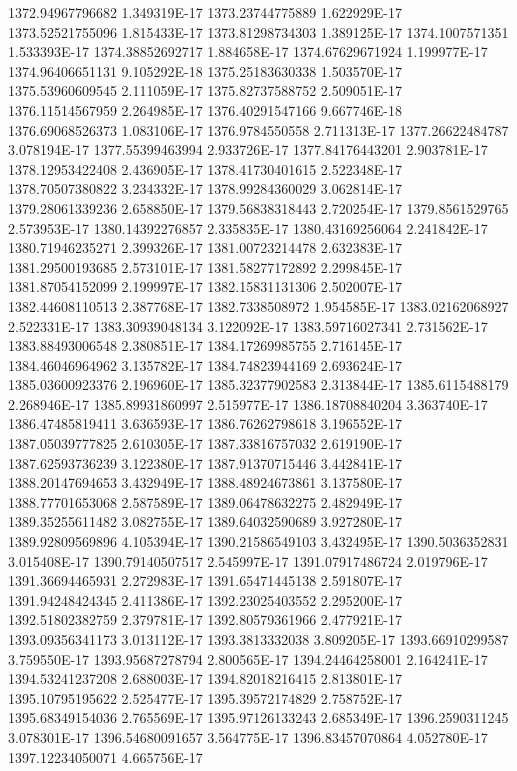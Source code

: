 1372.94967796682  1.349319E-17
1373.23744775889  1.622929E-17
1373.52521755096  1.815433E-17
1373.81298734303  1.389125E-17
1374.1007571351  1.533393E-17
1374.38852692717  1.884658E-17
1374.67629671924  1.199977E-17
1374.96406651131  9.105292E-18
1375.25183630338  1.503570E-17
1375.53960609545  2.111059E-17
1375.82737588752  2.509051E-17
1376.11514567959  2.264985E-17
1376.40291547166  9.667746E-18
1376.69068526373  1.083106E-17
1376.9784550558  2.711313E-17
1377.26622484787  3.078194E-17
1377.55399463994  2.933726E-17
1377.84176443201  2.903781E-17
1378.12953422408  2.436905E-17
1378.41730401615  2.522348E-17
1378.70507380822  3.234332E-17
1378.99284360029  3.062814E-17
1379.28061339236  2.658850E-17
1379.56838318443  2.720254E-17
1379.8561529765  2.573953E-17
1380.14392276857  2.335835E-17
1380.43169256064  2.241842E-17
1380.71946235271  2.399326E-17
1381.00723214478  2.632383E-17
1381.29500193685  2.573101E-17
1381.58277172892  2.299845E-17
1381.87054152099  2.199997E-17
1382.15831131306  2.502007E-17
1382.44608110513  2.387768E-17
1382.7338508972  1.954585E-17
1383.02162068927  2.522331E-17
1383.30939048134  3.122092E-17
1383.59716027341  2.731562E-17
1383.88493006548  2.380851E-17
1384.17269985755  2.716145E-17
1384.46046964962  3.135782E-17
1384.74823944169  2.693624E-17
1385.03600923376  2.196960E-17
1385.32377902583  2.313844E-17
1385.6115488179  2.268946E-17
1385.89931860997  2.515977E-17
1386.18708840204  3.363740E-17
1386.47485819411  3.636593E-17
1386.76262798618  3.196552E-17
1387.05039777825  2.610305E-17
1387.33816757032  2.619190E-17
1387.62593736239  3.122380E-17
1387.91370715446  3.442841E-17
1388.20147694653  3.432949E-17
1388.48924673861  3.137580E-17
1388.77701653068  2.587589E-17
1389.06478632275  2.482949E-17
1389.35255611482  3.082755E-17
1389.64032590689  3.927280E-17
1389.92809569896  4.105394E-17
1390.21586549103  3.432495E-17
1390.5036352831  3.015408E-17
1390.79140507517  2.545997E-17
1391.07917486724  2.019796E-17
1391.36694465931  2.272983E-17
1391.65471445138  2.591807E-17
1391.94248424345  2.411386E-17
1392.23025403552  2.295200E-17
1392.51802382759  2.379781E-17
1392.80579361966  2.477921E-17
1393.09356341173  3.013112E-17
1393.3813332038  3.809205E-17
1393.66910299587  3.759550E-17
1393.95687278794  2.800565E-17
1394.24464258001  2.164241E-17
1394.53241237208  2.688003E-17
1394.82018216415  2.813801E-17
1395.10795195622  2.525477E-17
1395.39572174829  2.758752E-17
1395.68349154036  2.765569E-17
1395.97126133243  2.685349E-17
1396.2590311245  3.078301E-17
1396.54680091657  3.564775E-17
1396.83457070864  4.052780E-17
1397.12234050071  4.665756E-17
